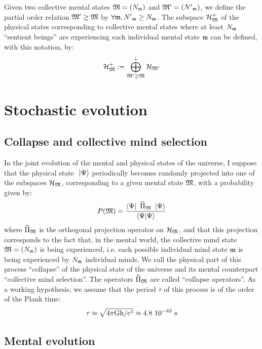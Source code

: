 \documentclass[10pt,a4paper,twoside,openany]{book}
\begin{document}
Given two collective mental states $\mathfrak{M} = ({N}_{\mathfrak{m}})$ and $\mathfrak{M}' = ({N'}_{\mathfrak{m}})$, we define the partial order relation $\mathfrak{M}' \geq \mathfrak{M}$ by $\forall \mathfrak{m}, {N'}_{\mathfrak{m}} \geq {N}_{\mathfrak{m}}$. The subspace $\mathcal H_{\mathfrak{M}}^+$ of the physical states corresponding to collective mental states where at least ${N}_{\mathfrak{m}}$ ``sentient beings'' are experiencing each individual mental state $\mathfrak{m}$ can be defined, with this notation, by:
\begin{equation*}
\mathcal H_{\mathfrak{M}}^+ := \bigoplus_{\mathfrak{M}' \geq \mathfrak{M}}^\perp \mathcal H_{\mathfrak{M}'}
\end{equation*}

\chapter{Stochastic evolution}
\label{Stochastic evolution}

\section{Collapse and collective mind selection}

In the joint evolution of the mental and physical states of the universe, I suppose that the physical state $\ \left|{\Psi}\right\rangle$ periodically becomes randomly projected into one of the subspaces $\mathcal H_{\mathfrak{M}}$, corresponding to a given mental state $\mathfrak{M}$, with a probability given by:
\begin{equation*}
P(\mathfrak{M}) = \frac{\left\langle{\Psi}\right|\  \widehat{\Pi}_{\mathfrak{M}} \ \left|{\Psi}\right\rangle}{\left\langle{\Psi}|{\Psi}\right\rangle}
\end{equation*}
where $\widehat{\Pi}_{\mathfrak{M}}$ is the orthogonal projection operator on $\mathcal H_{\mathfrak{M}}$, and that this projection corresponds to the fact that, in the mental world, the collective mind state $\mathfrak{M} = ({N}_{\mathfrak{m}})$ is being experienced, i.e. each possible individual mind state $\mathfrak{m}$ is being experienced by ${N}_{\mathfrak{m}}$ individual minds. We call the physical part of this process ``collapse'' of the physical state of the universe and its mental counterpart ``collective mind selection''. The operators $\widehat{\Pi}_{\mathfrak{M}}$ are called ``collapse operators''. As a working hypothesis, we assume that the period $\tau$ of this process is of the order of the Plank time:
\begin{equation*}
\tau \approx \sqrt{4\pi\mathrm G \mathrm h/\mathrm c^5}\approx4.8~10^{-43}\ \mathrm s
\end{equation*}

\section{Mental evolution}
\end{document}

